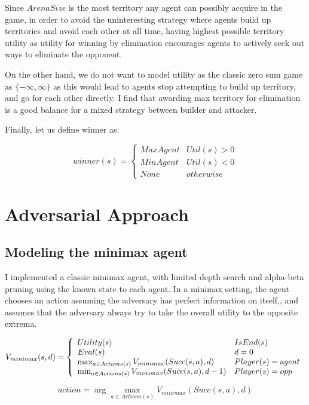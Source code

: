 \documentclass{article}
\begin{document}
Since $ArenaSize$ is the most territory any agent can possibly acquire in the game, in order to avoid the uninteresting strategy where agents build up territories and avoid each other at all time, having highest possible territory utility as utility for winning by elimination encourages agents to actively seek out ways to eliminate the opponent. 

On the other hand, we do not want to model utility as the classic zero sum game as $\{-\infty, \infty\}$ as this would lead to agents stop attempting to build up territory, and go for each other directly. I find that awarding max territory for elimination is a good balance for a mixed strategy between builder and attacker.

Finally, let us define winner as:

\[
winner(s) = 
\begin{cases}
    MaxAgent & Util(s) > 0 \\
    MinAgent & Util(s) < 0 \\ 
    None & otherwise
\end{cases}
\]


\section{Adversarial Approach}

\subsection{Modeling the minimax agent}

I implemented a classic minimax agent, with limited depth search and alpha-beta pruning using the known state to each agent. In a minimax setting, the agent chooses an action assuming the adversary has perfect information on itself,, and assumes that the adversary always try to take the overall utility to the opposite extrema. 

\[
V_{minimax}(s, d)=\left\{\begin{array}{ll}{Utility(s)} & {IsEnd(s)} \\ {Eval(s)} & {d=0} \\ {\max _{a \in Actions(s)} V_{minimax}(Succ(s, a), d)} & {Player(s)=\text agent} \\ {\min _{a \in Actions(s)} V_{minimax}(Succ(s, a), d-1)} & {Player(s)=opp}\end{array}\right.
\]

\[
action = \arg \max_{a \in Actions(s)} V_{minimax}(Succ(s,a), d)
\]
\end{document}
